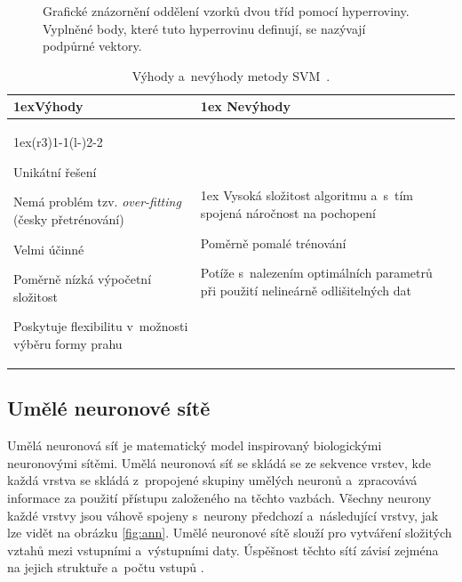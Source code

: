 \begin{figure}[H]
    \centering
    \caption{Grafické znázornění oddělení vzorků dvou tříd pomocí hyperroviny. Vyplněné body, které tuto hyperrovinu definují, se nazývají podpůrné vektory.}
    \label{fig:svmObrazek}
\end{figure}

\begin{table}[H]
\begin{tabularx}{\linewidth}{>{\parskip1ex}X@{\kern4\tabcolsep}>{\parskip1ex}X}
\toprule
\hfil\bfseries Výhody
&
\hfil\bfseries Nevýhody
\\\cmidrule(r{3\tabcolsep}){1-1}\cmidrule(l{-\tabcolsep}){2-2}

Unikátní řešení\par
Nemá problém tzv. \emph{over-fitting} (česky přetrénování)\par
Velmi účinné\par
Poměrně nízká výpočetní složitost\par
Poskytuje flexibilitu v~možnosti výběru formy prahu
&
Vysoká složitost algoritmu a~s~tím spojená náročnost na pochopení\par
Poměrně pomalé trénování\par
Potíže s~nalezením optimálních parametrů při použití nelineárně odlišitelných dat


\\\bottomrule
\end{tabularx}
\caption{Výhody a~nevýhody metody SVM~\cite{classificMethodsComp2, classificMethodsComp3}.}
\end{table}


\subsection*{Umělé neuronové sítě}
\label{ANN}
Umělá neuronová síť je matematický model inspirovaný biologickými neuronovými sítěmi. Umělá neuronová síť se skládá se ze sekvence vrstev, kde každá vrstva se skládá z~propojené skupiny umělých neuronů a~zpracovává informace za použití přístupu založeného na těchto vazbách. Všechny neurony každé vrstvy jsou váhově spojeny s~neurony předchozí a~následující vrstvy, jak lze vidět na obrázku \ref{fig:ann}. Umělé neuronové sítě slouží pro vytváření složitých vztahů mezi vstupními a~výstupními daty. Úspěšnost těchto sítí závisí zejména na jejich struktuře a~počtu vstupů \cite{classificMethodsComp1, classificMethodsComp3, CVmodernApproach}.

